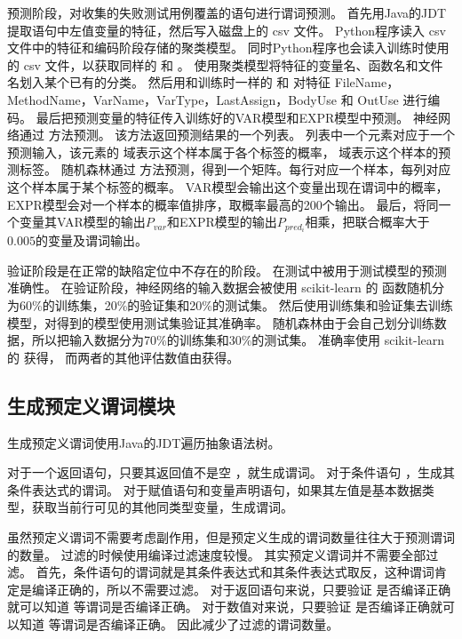 预测阶段，对收集的失败测试用例覆盖的语句进行谓词预测。
首先用Java的JDT提取语句中左值变量的特征，然后写入磁盘上的 csv 文件。
Python程序读入 csv 文件中的特征和编码阶段存储的聚类模型。
同时Python程序也会读入训练时使用的 csv 文件，以获取同样的  和 。
使用聚类模型将特征的变量名、函数名和文件名划入某个已有的分类。
然后用和训练时一样的  和  对特征 FileName，MethodName，VarName，VarType，LastAssign，BodyUse
和 OutUse 进行编码。
最后把预测变量的特征传入训练好的VAR模型和EXPR模型中预测。
神经网络通过  方法预测。
该方法返回预测结果的一个列表。
列表中一个元素对应于一个预测输入，该元素的  域表示这个样本属于各个标签的概率，
 域表示这个样本的预测标签。
随机森林通过  方法预测，得到一个矩阵。每行对应一个样本，每列对应这个样本属于某个标签的概率。
VAR模型会输出这个变量出现在谓词中的概率，EXPR模型会对一个样本的概率值排序，取概率最高的200个输出。
最后，将同一个变量其VAR模型的输出$P_{var}$和EXPR模型的输出$P_{pred_i}$相乘，把联合概率大于$0.005$的变量及谓词输出。

验证阶段是在正常的缺陷定位中不存在的阶段。
在测试中被用于测试模型的预测准确性。
在验证阶段，神经网络的输入数据会被使用 scikit-learn 的  函数随机分为60\%的训练集，20\%的验证集和20\%的测试集。
然后使用训练集和验证集去训练模型，对得到的模型使用测试集验证其准确率。
随机森林由于会自己划分训练数据，所以把输入数据分为70\%的训练集和30\%的测试集。
准确率使用 scikit-learn 的  获得，
而两者的其他评估数值由获得。

\subsection{生成预定义谓词模块}

生成预定义谓词使用Java的JDT遍历抽象语法树。

对于一个返回语句，只要其返回值不是空 ，就生成谓词。
对于条件语句 ，生成其条件表达式的谓词。
对于赋值语句和变量声明语句，如果其左值是基本数据类型，获取当前行可见的其他同类型变量，生成谓词。

虽然预定义谓词不需要考虑副作用，但是预定义生成的谓词数量往往大于预测谓词的数量。
过滤的时候使用编译过滤速度较慢。
其实预定义谓词并不需要全部过滤。
首先，条件语句的谓词就是其条件表达式和其条件表达式取反，这种谓词肯定是编译正确的，所以不需要过滤。
对于返回语句来说，只要验证  是否编译正确就可以知道  等谓词是否编译正确。
对于数值对来说，只要验证  是否编译正确就可以知道  等谓词是否编译正确。
因此减少了过滤的谓词数量。

